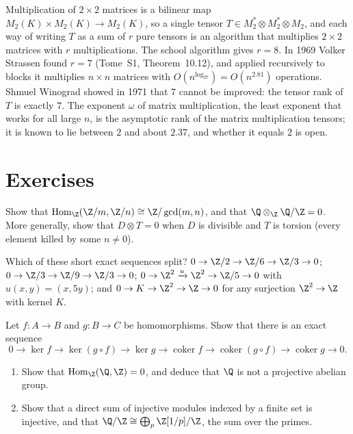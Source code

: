 \begin{beauty}
Multiplication of $2\times2$ matrices is a bilinear map $M_2(K)\times M_2(K)\to M_2(K)$, so a single tensor $T\in M_2^*\otimes M_2^*\otimes M_2$, and each way of writing $T$ as a sum of $r$ pure tensors is an algorithm that multiplies
$2\times2$ matrices with $r$ multiplications. The school algorithm gives $r=8$. In 1969 Volker Strassen found $r=7$ (Tome~S1, Theorem~10.12), and applied recursively to blocks it multiplies $n\times n$ matrices with
$O(n^{\log_27})=O(n^{2.81})$ operations. Shmuel Winograd showed in 1971 that $7$ cannot be improved: the tensor rank of $T$ is exactly $7$. The exponent $\omega$ of matrix multiplication, the least exponent that works for all
large $n$, is the asymptotic rank of the matrix multiplication tensors; it is known to lie between $2$ and about $2.37$, and whether it equals $2$ is open.
\end{beauty}

\section{Exercises}

\begin{exercise}[$\star$]\label{ex:zmzncomp}
Show that $\operatorname{Hom}_{\Z}(\Z/m,\Z/n)\cong\Z/\gcd(m,n)$, and that $\Q\otimes_{\Z}\Q/\Z=0$. More generally, show that $D\otimes T=0$ when $D$ is divisible and $T$ is torsion (every element killed by some $n\ne0$).
\end{exercise}

\begin{exercise}[$\star$]\label{ex:whichsplit}
Which of these short exact sequences split? $0\to\Z/2\to\Z/6\to\Z/3\to0$; $0\to\Z/3\to\Z/9\to\Z/3\to0$; $0\to\Z^2\xrightarrow{u}\Z^2\to\Z/5\to0$ with $u(x,y)=(x,5y)$; and $0\to K\to\Z^2\to\Z\to0$ for any surjection $\Z^2\to\Z$ with kernel $K$.
\end{exercise}

\begin{exercise}[$\star\star$]\label{ex:composite}
Let $f\colon A\to B$ and $g\colon B\to C$ be homomorphisms. Show that there is an exact sequence
\[0\to\ker f\to\ker(g\circ f)\to\ker g\to\operatorname{coker}f\to\operatorname{coker}(g\circ f)\to\operatorname{coker}g\to0.\]
\end{exercise}

\begin{exercise}[$\star\star$]\label{ex:qnotproj}
\leavevmode
\begin{enumerate}[label=(\alph*)]
\item Show that $\operatorname{Hom}_{\Z}(\Q,\Z)=0$, and deduce that $\Q$ is not a projective abelian group.
\item Show that a direct sum of injective modules indexed by a finite set is injective, and that $\Q/\Z\cong\bigoplus_p\Z[1/p]/\Z$, the sum over the primes.
\end{enumerate}
\end{exercise}

